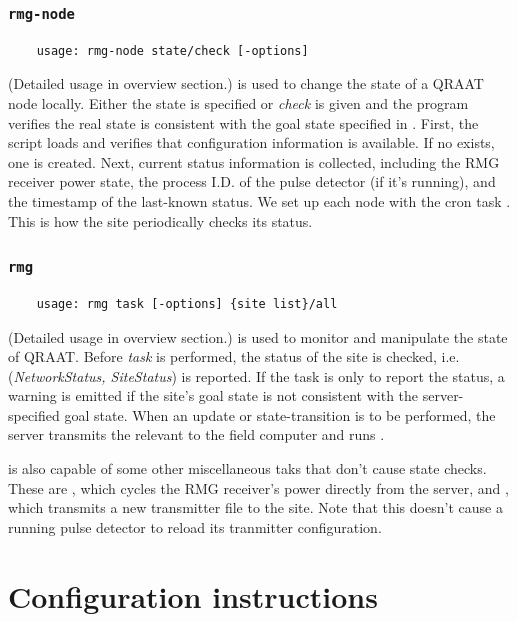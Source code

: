 \documentclass[letter]{article}
\begin{document}
\subsubsection{\texttt{rmg-node}}
\begin{verbatim}
    usage: rmg-node state/check [-options]
\end{verbatim}
(Detailed usage in overview section.)  is used to change the state 
of a QRAAT node locally. Either the state is specified or \textit{check} is given and the
program verifies the real state is consistent with the goal state specified in 
. First, the script loads  and 
verifies that configuration information is available. If no  exists, 
one is created. Next, current status information is collected, including the RMG 
receiver power state, the process I.D. of the pulse detector (if it's running), and
the timestamp of the last-known status. We set up each node with the cron task 
. This is how the site periodically checks its status. 

\subsubsection{\texttt{rmg}}
\begin{verbatim}
    usage: rmg task [-options] {site list}/all 
\end{verbatim}
(Detailed usage in overview section.)  is used to monitor and manipulate the 
state of QRAAT. Before \textit{task} is performed, the status of the site is checked, 
i.e. (\textit{NetworkStatus, SiteStatus}) is reported. If the task is only to report 
the status, a warning is emitted if the site's goal state is not consistent with the
server-specified goal state. When an update or state-transition is to be performed, 
the server transmits the relevant  to the field computer and runs 
. 

 is also capable of some other miscellaneous taks that don't cause state 
checks. These are , which cycles the RMG receiver's power directly 
from the server, and , which transmits a new transmitter file to 
the site. Note that this doesn't cause a running pulse detector to reload its 
tranmitter configuration. 


\section{Configuration instructions}
\end{document}

